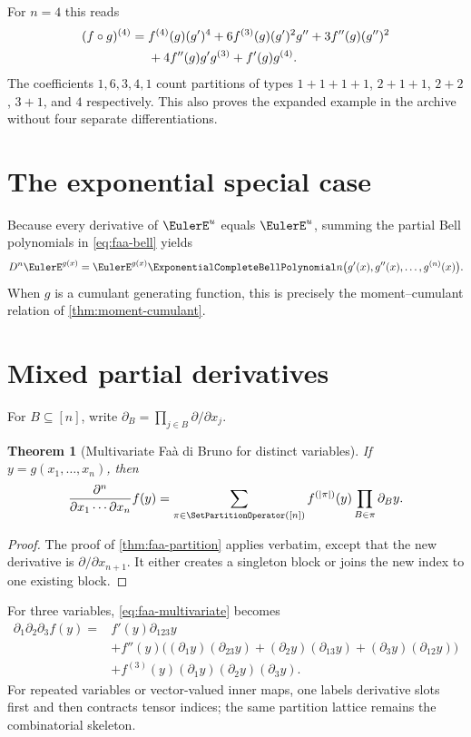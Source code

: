 \documentclass[11pt,a4paper,oneside,openany]{book}
\newtheorem{theorem}{Theorem}[chapter]
\theoremstyle{definition}
\theoremstyle{remark}
\begin{document}
For $n=4$ this reads
\begin{align}
 (f\circ g)^{(4)}={}&f^{(4)}(g)(g')^4
 +6f^{(3)}(g)(g')^2g''+3f''(g)(g'')^2\notag\\
 &+4f''(g)g'g^{(3)}+f'(g)g^{(4)}.
 \label{eq:faa-n4}
\end{align}
The coefficients $1,6,3,4,1$ count partitions of types
$1+1+1+1$, $2+1+1$, $2+2$, $3+1$, and $4$ respectively.  This also proves the
expanded example in the archive without four separate differentiations.

\section{The exponential special case}
Because every derivative of $\EulerE^u$ equals $\EulerE^u$, summing the partial Bell
polynomials in \eqref{eq:faa-bell} yields
\begin{equation}\label{eq:exp-faa}
 D^n \EulerE^{g(x)}=\EulerE^{g(x)}
 \ExponentialCompleteBellPolynomial n\bigl(g'(x),g''(x),\ldots,g^{(n)}(x)\bigr).
\end{equation}
When $g$ is a cumulant generating function, this is precisely the
moment--cumulant relation of \cref{thm:moment-cumulant}.

\section{Mixed partial derivatives}
For $B\subseteq[n]$, write
$\partial_B=\prod_{j\in B}\partial/\partial x_j$.
\begin{theorem}[Multivariate Fa\`a di Bruno for distinct variables]
\label{thm:faa-multivariate}
If $y=g(x_1,\ldots,x_n)$, then
\begin{equation}\label{eq:faa-multivariate}
 \frac{\partial^n}{\partial x_1\cdots\partial x_n}f(y)
 =\sum_{\pi\in\SetPartitionOperator([n])}f^{(|\pi|)}(y)
   \prod_{B\in\pi}\partial_B y.
\end{equation}
\end{theorem}
\begin{proof}
The proof of \cref{thm:faa-partition} applies verbatim, except that the new
derivative is $\partial/\partial x_{n+1}$.  It either creates a singleton block or
joins the new index to one existing block.
\end{proof}

For three variables, \eqref{eq:faa-multivariate} becomes
\begin{align*}
 \partial_1\partial_2\partial_3f(y)
 ={}&f'(y)\partial_{123}y\\
 &+f''(y)\bigl((\partial_1y)(\partial_{23}y)
 +(\partial_2y)(\partial_{13}y)+(\partial_3y)(\partial_{12}y)\bigr)\\
 &+f^{(3)}(y)(\partial_1y)(\partial_2y)(\partial_3y).
\end{align*}
For repeated variables or vector-valued inner maps, one labels derivative slots
first and then contracts tensor indices; the same partition lattice remains the
combinatorial skeleton.
\end{document}
